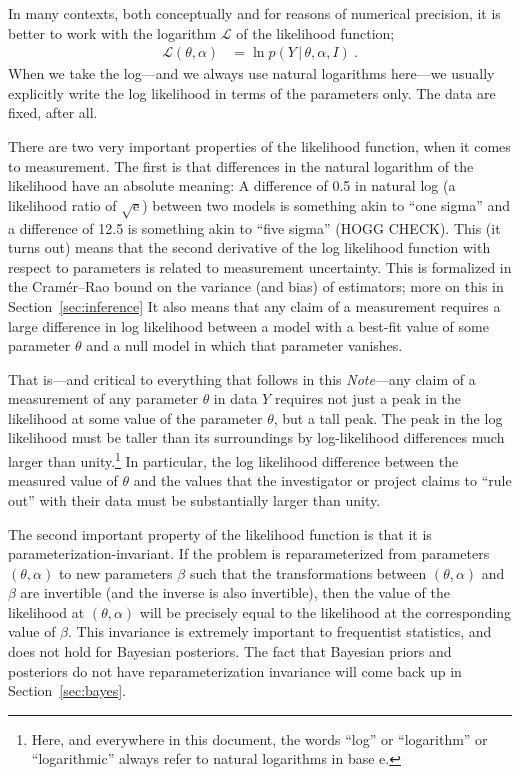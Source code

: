 \documentclass{article}
\newcommand{\documentname}{\textsl{Note}}
\newcommand{\sectionname}{Section}
\newcommand{\secref}[1]{\sectionname~\ref{#1}}
\newcommand{\e}{\mathrm{e}} %
\newcommand{\given}{\,|\,}
\begin{document}
In many contexts, both conceptually and for reasons of numerical precision, it is better to work with the logarithm $\mathscr{L}$ of the likelihood function;
\begin{align}
    \mathscr{L}(\theta,\alpha) &= \ln p(Y\given\theta,\alpha,I) ~.
\end{align}
When we take the log---and we always use natural logarithms here---we usually explicitly write the log likelihood in terms of the parameters only.
The data are fixed, after all.

There are two very important properties of the likelihood function, when it comes to measurement.
The first is that differences in the natural logarithm of the likelihood have an absolute meaning:
A difference of 0.5 in natural log (a likelihood ratio of $\sqrt{\e}$) between two models is something akin to ``one sigma'' and a difference of 12.5 is something akin to ``five sigma'' (HOGG CHECK).
This (it turns out) means that the second derivative of the log likelihood function with respect to parameters is related to measurement uncertainty.
This is formalized in the Cram\'er--Rao bound \cite{cramer, rao} on the variance (and bias) of estimators; more on this in \secref{sec:inference}
It also means that any claim of a measurement requires a large difference in log likelihood between a model with a best-fit value of some parameter $\theta$ and a null model in which that parameter vanishes.

That is---and critical to everything that follows in this \documentname---any claim of a measurement of any parameter $\theta$ in data $Y$ requires not just a peak in the likelihood at some value of the parameter $\theta$, but a tall peak.
The peak in the log likelihood must be taller than its surroundings by log-likelihood differences much larger than unity.\footnote{Here, and everywhere in this document, the words ``log'' or ``logarithm'' or ``logarithmic'' always refer to natural logarithms in base $\e$.}
In particular, the log likelihood difference between the measured value of $\theta$ and the values that the investigator or project claims to ``rule out'' with their data must be substantially larger than unity.

The second important property of the likelihood function is that it is parameterization-invariant.
If the problem is reparameterized from parameters $(\theta,\alpha)$ to new parameters $\beta$ such that the transformations between $(\theta,\alpha)$ and $\beta$ are invertible (and the inverse is also invertible), then the value of the likelihood at $(\theta,\alpha)$ will be precisely equal to the likelihood at the corresponding value of $\beta$.
This invariance is extremely important to frequentist statistics, and does not hold for Bayesian posteriors.
The fact that Bayesian priors and posteriors do not have reparameterization invariance will come back up in \secref{sec:bayes}.
\end{document}
